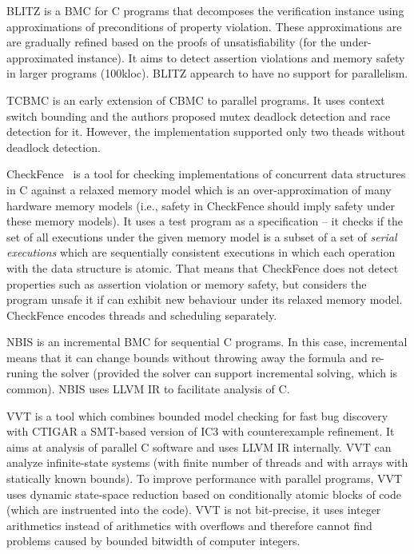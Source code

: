 BLITZ  is a BMC for C programs that decomposes the verification instance using approximations of preconditions of property violation.
These approximations are are gradually refined based on the proofs of unsatisfiability (for the under-approximated instance).
It aims to detect assertion violations and memory safety in larger programs (100kloc).
BLITZ appearch to have no support for parallelism.


TCBMC  is an early extension of CBMC to parallel programs.
It uses context switch bounding and the authors proposed mutex deadlock detection and race detection for it.
However, the implementation supported only two theads without deadlock detection.

CheckFence~ is a tool for checking implementations of concurrent data structures in C against a relaxed memory model which is an over-approximation of many hardware memory models (i.e., safety in CheckFence should imply safety under these memory models).
It uses a test program as a specification -- it checks if the set of all executions under the given memory model is a subset of a set of \emph{serial executions} which are sequentially consistent executions in which each operation with the data structure is atomic.
That means that CheckFence does not detect properties such as assertion violation or memory safety, but considers the program unsafe it if can exhibit new behaviour under its relaxed memory model.
CheckFence encodes threads and scheduling separately.

NBIS  is an incremental BMC for sequential C programs.
In this case, incremental means that it can change bounds without throwing away the formula and re-runing the solver (provided the solver can support incremental solving, which is common).
NBIS uses LLVM IR to facilitate analysis of C.

VVT  is a tool which combines bounded model checking for fast bug discovery with CTIGAR a SMT-based version of IC3 with counterexample refinement.
It aims at analysis of parallel C software and uses LLVM IR internally.
VVT can analyze infinite-state systems (with finite number of threads and with arrays with statically known bounds).
To improve performance with parallel programs, VVT uses dynamic state-space reduction based on conditionally atomic blocks of code (which are instruented into the code).
VVT is not bit-precise, it uses integer arithmetics instead of arithmetics with overflows and therefore cannot find problems caused by bounded bitwidth of computer integers.


